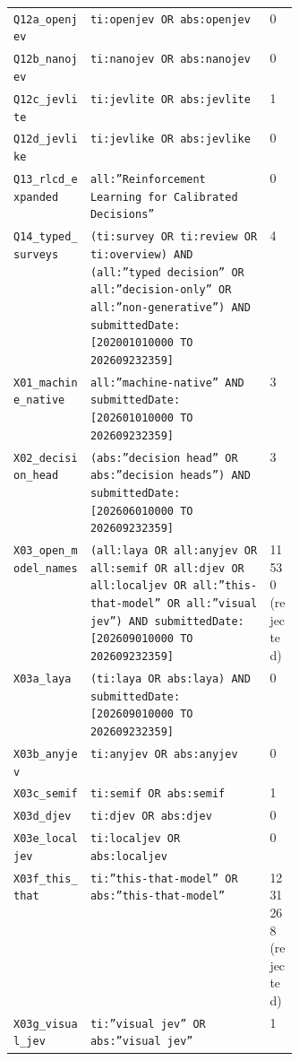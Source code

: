 {\begin{xltabular}{\linewidth}{>{\raggedright\arraybackslash}p{0.27\linewidth}Xp{0.1\linewidth}}
\texttt{\footnotesize Q12a\_openjev} & \texttt{\footnotesize ti:openjev OR abs:openjev} & 0 \\
\texttt{\footnotesize Q12b\_nanojev} & \texttt{\footnotesize ti:nanojev OR abs:nanojev} & 0 \\
\texttt{\footnotesize Q12c\_jevlite} & \texttt{\footnotesize ti:jevlite OR abs:jevlite} & 1 \\
\texttt{\footnotesize Q12d\_jevlike} & \texttt{\footnotesize ti:jevlike OR abs:jevlike} & 0 \\
\texttt{\footnotesize Q13\_rlcd\_expanded} & \texttt{\footnotesize all:”Reinforcement Learning for Calibrated Decisions”} & 0 \\
\texttt{\footnotesize Q14\_typed\_surveys} & \texttt{\footnotesize (ti:survey OR ti:review OR ti:overview) AND (all:”typed decision” OR all:”decision-only” OR all:”non-generative”) AND submittedDate:[202001010000 TO 202609232359]} & 4 \\
\texttt{\footnotesize X01\_machine\_native} & \texttt{\footnotesize all:”machine-native” AND submittedDate:[202601010000 TO 202609232359]} & 3 \\
\texttt{\footnotesize X02\_decision\_head} & \texttt{\footnotesize (abs:”decision head” OR abs:”decision heads”) AND submittedDate:[202606010000 TO 202609232359]} & 3 \\
\texttt{\footnotesize X03\_open\_model\_names} & \texttt{\footnotesize (all:laya OR all:anyjev OR all:semif OR all:djev OR all:localjev OR all:”this-that-model” OR all:”visual jev”) AND submittedDate:[202609010000 TO 202609232359]} & 11530 (rejected) \\
\texttt{\footnotesize X03a\_laya} & \texttt{\footnotesize (ti:laya OR abs:laya) AND submittedDate:[202609010000 TO 202609232359]} & 0 \\
\texttt{\footnotesize X03b\_anyjev} & \texttt{\footnotesize ti:anyjev OR abs:anyjev} & 0 \\
\texttt{\footnotesize X03c\_semif} & \texttt{\footnotesize ti:semif OR abs:semif} & 1 \\
\texttt{\footnotesize X03d\_djev} & \texttt{\footnotesize ti:djev OR abs:djev} & 0 \\
\texttt{\footnotesize X03e\_localjev} & \texttt{\footnotesize ti:localjev OR abs:localjev} & 0 \\
\texttt{\footnotesize X03f\_this\_that} & \texttt{\footnotesize ti:”this-that-model” OR abs:”this-that-model”} & 1231268 (rejected) \\
\texttt{\footnotesize X03g\_visual\_jev} & \texttt{\footnotesize ti:”visual jev” OR abs:”visual jev”} & 1 \\

\end{xltabular}}
